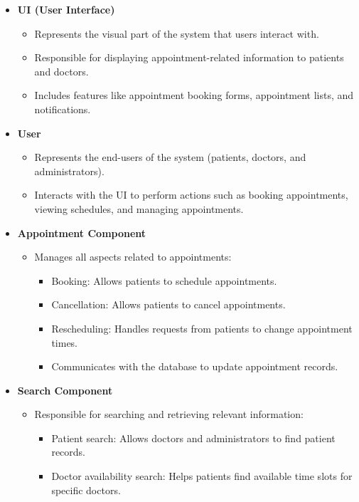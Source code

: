 \documentclass[a4paper, 12pt]{article}
\begin{document}
\begin{itemize}
    \item \textbf{UI (User Interface)}
    \begin{itemize}
        \item Represents the visual part of the system that users interact with.
        \item Responsible for displaying appointment-related information to patients and doctors.
        \item Includes features like appointment booking forms, appointment lists, and notifications.
    \end{itemize}
    
    \item \textbf{User}
    \begin{itemize}
        \item Represents the end-users of the system (patients, doctors, and administrators).
        \item Interacts with the UI to perform actions such as booking appointments, viewing schedules, and managing appointments.
    \end{itemize}
    
    \item \textbf{Appointment Component}
    \begin{itemize}
        \item Manages all aspects related to appointments:
        \begin{itemize}
            \item Booking: Allows patients to schedule appointments.
            \item Cancellation: Allows patients to cancel appointments.
            \item Rescheduling: Handles requests from patients to change appointment times.
            \item Communicates with the database to update appointment records.
        \end{itemize}
    \end{itemize}
    
    \item \textbf{Search Component}
    \begin{itemize}
        \item Responsible for searching and retrieving relevant information:
        \begin{itemize}
            \item Patient search: Allows doctors and administrators to find patient records.
            \item Doctor availability search: Helps patients find available time slots for specific doctors.
        \end{itemize}
    \end{itemize}
    

\end{itemize}
\end{document}
